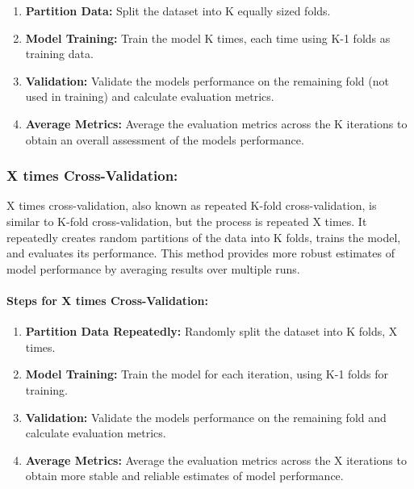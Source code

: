 \documentclass[
]{article}
\begin{document}
\begin{enumerate}
\def\labelenumi{\arabic{enumi}.}
\item
  \textbf{Partition Data:} Split the dataset into K equally sized folds.
\item
  \textbf{Model Training:} Train the model K times, each time using K-1
  folds as training data.
\item
  \textbf{Validation:} Validate the model\textquotesingle s performance
  on the remaining fold (not used in training) and calculate evaluation
  metrics.
\item
  \textbf{Average Metrics:} Average the evaluation metrics across the K
  iterations to obtain an overall assessment of the
  model\textquotesingle s performance.
\end{enumerate}

\hypertarget{x-times-cross-validation}{%
\subsubsection{X times
Cross-Validation:}\label{x-times-cross-validation}}

X times cross-validation, also known as repeated K-fold
cross-validation, is similar to K-fold cross-validation, but the process
is repeated X times. It repeatedly creates random partitions of the data
into K folds, trains the model, and evaluates its performance. This
method provides more robust estimates of model performance by averaging
results over multiple runs.

\hypertarget{steps-for-x-times-cross-validation}{%
\paragraph{Steps for X times
Cross-Validation:}\label{steps-for-x-times-cross-validation}}

\begin{enumerate}
\def\labelenumi{\arabic{enumi}.}
\item
  \textbf{Partition Data Repeatedly:} Randomly split the dataset into K
  folds, X times.
\item
  \textbf{Model Training:} Train the model for each iteration, using K-1
  folds for training.
\item
  \textbf{Validation:} Validate the model\textquotesingle s performance
  on the remaining fold and calculate evaluation metrics.
\item
  \textbf{Average Metrics:} Average the evaluation metrics across the X
  iterations to obtain more stable and reliable estimates of model
  performance.
\end{enumerate}
\end{document}
